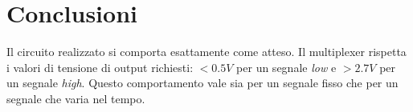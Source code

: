 \section{Conclusioni}\label{sec:conclusioni}
Il circuito realizzato si comporta esattamente come atteso.
Il multiplexer rispetta i valori di tensione di output richiesti: $<0.5V$ per un
segnale \emph{low} e $>2.7V$ per un segnale \emph{high}.
Questo comportamento vale sia per un segnale fisso che per un segnale che varia nel tempo.